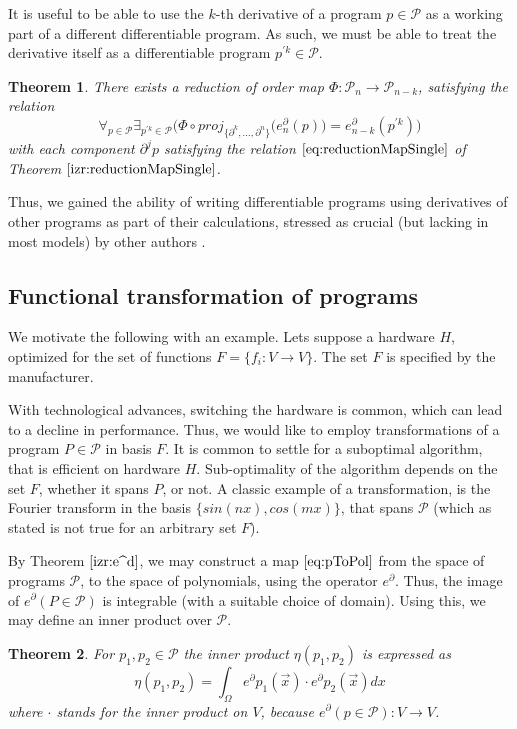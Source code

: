 \documentclass{article}
\newcommand{\dP}{\mathcal{P}}
\newcommand{\D}{\partial}
\newtheorem{izrek}{Theorem}[section]
\begin{document}
 It is useful to be able to use the $k$-th derivative of a program $p\in\dP$ as a working part of a different differentiable program. As such, we must be able to treat the derivative itself as a differentiable program $p^{\prime k}\in\dP$. 
 \begin{izrek}\label{izr:reductionMap}
 There exists a reduction of order map $\Phi:\dP_n\to\dP_{n-k}$, satisfying the relation
 \begin{equation}\label{eq:reductionMap}
 \forall_{p\in\dP}\exists_{p^{\prime k}\in\dP}\Big(\Phi\circ proj_{\{\D^k,...,\D^n\}}\big(e^\D_n(p)\big)=e^\D_{n-k}(p^{\prime k})\Big)
 \end{equation}
 with each component $\D^jp$ satisfying the relation $\eqref{eq:reductionMapSingle}$ of Theorem $\ref{izr:reductionMapSingle}$.
 \end{izrek}
 Thus, we gained the ability of writing differentiable programs using derivatives of other programs as part of their calculations, stressed as crucial (but lacking in most models) by other authors \cite{AD1}.
 
   \subsection{Functional transformation of programs}\label{sec:FTP}
   
   We motivate the following with an example. Lets suppose a hardware $H$, optimized for the set of functions $F=\{f_i:V\to V\}$. The set $F$ is specified by the manufacturer.
   
   With technological advances, switching the hardware is common, which can lead to a decline in performance. Thus, we would like to employ transformations of a program $P\in\dP$ in basis $F$. It is common to settle for a suboptimal algorithm, that is efficient on hardware $H$. Sub-optimality of the algorithm depends on the set $F$, whether it spans $P$, or not. A classic example of a transformation, is the Fourier transform in the basis $\{sin(nx), cos(mx)\}$, that spans $\dP$ (which as stated is not true for an arbitrary set $F$).
   
   By Theorem $\ref{izr:e^d}$, we may construct a map $\eqref{eq:pToPol}$ from the space of programs $\dP$, to the space of polynomials, using the operator $e^\D$. Thus, the image of $e^\D(P\in\dP)$ is integrable (with a suitable choice of domain). Using this, we may define an inner product over $\dP$.
   
  \begin{izrek}
  For $p_1,p_2\in\dP$ the inner product $\eta(p_1,p_2)$ is expressed as
  \begin{equation}
  	\eta(p_1,p_2)=\int_{\Omega}e^\D p_1(\vec{x})\cdot e^\D p_2(\vec{x})dx
  \end{equation}
  where $\cdot$ stands for the inner product on $V$, because $e^\D(p\in\dP):V\to V$.
  \end{izrek}
  
\end{document}
